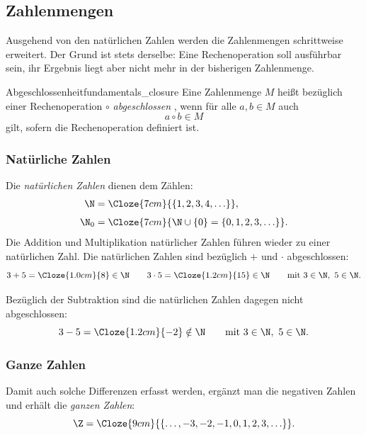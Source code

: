 \subsection{Zahlenmengen}
\label{subsec:fundamentals_number_sets}

Ausgehend von den natürlichen Zahlen werden die Zahlenmengen schrittweise
erweitert. Der Grund ist stets derselbe: Eine Rechenoperation soll ausführbar
sein, ihr Ergebnis liegt aber nicht mehr in der bisherigen Zahlenmenge.

\begin{DefinitionBox}{Abgeschlossenheit}{fundamentals_closure}
  Eine Zahlenmenge $M$ heißt bezüglich einer Rechenoperation $\circ$
  \emph{abgeschlossen} , wenn für alle $a,b\in M$ auch
  \[
    a\circ b\in M
  \]
  gilt, sofern die Rechenoperation definiert ist.
\end{DefinitionBox}

\subsubsection{Natürliche Zahlen}
\label{subsubsec:fundamentals_natural_numbers}

Die \emph{natürlichen Zahlen} dienen dem Zählen:
\begin{align*}
  \N
    &= \Cloze{7cm}{\{1,2,3,4,\ldots\}},\\[0.4em]
  \N_0
    &= \Cloze{7cm}{\N\cup\{0\}=\{0,1,2,3,\ldots\}}.
\end{align*}
Die Addition und Multiplikation natürlicher Zahlen führen wieder zu einer
natürlichen Zahl. Die natürlichen Zahlen sind bezüglich $+$ und $\cdot$
abgeschlossen:
\[
  3+5=\Cloze{1.0cm}{8}\in\N
  \qquad
  3\cdot5=\Cloze{1.2cm}{15}\in\N
  \qquad \text{mit } 3\in\N,\ 5\in\N.
\]

Bezüglich der Subtraktion sind die natürlichen Zahlen dagegen nicht
abgeschlossen:
\[
  3-5=\Cloze{1.2cm}{-2}\notin\N
  \qquad \text{mit } 3\in\N,\ 5\in\N.
\]

\subsubsection{Ganze Zahlen}
\label{subsubsec:fundamentals_integer_numbers}

Damit auch solche Differenzen erfasst werden, ergänzt man die negativen Zahlen
und erhält die \emph{ganzen Zahlen}:
\[
  \Z=\Cloze{9cm}{\{\ldots,-3,-2,-1,0,1,2,3,\ldots\}}.
\]
\begin{center}
  \begingroup
    \def\NumberSetStage{2}
  \endgroup
\end{center}

